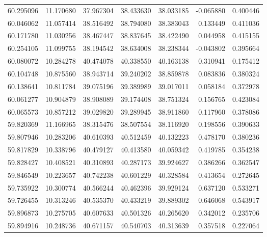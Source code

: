 \begin{tabular}{rrrrrrr}
 60.295096 &  11.170680 &         37.967304 &         38.433630 &         38.033185 & -0.065880 &  0.400446 \\
 60.046062 &  11.057414 &         38.516492 &         38.794080 &         38.383043 &  0.133449 &  0.411036 \\
 60.171780 &  11.030256 &         38.467447 &         38.837645 &         38.422490 &  0.044958 &  0.415155 \\
 60.254105 &  11.099755 &         38.194542 &         38.634008 &         38.238344 & -0.043802 &  0.395664 \\
 60.080072 &  10.284278 &         40.474078 &         40.338550 &         40.163138 &  0.310941 &  0.175412 \\
 60.104748 &  10.875560 &         38.943714 &         39.240202 &         38.859878 &  0.083836 &  0.380324 \\
 60.138641 &  10.811784 &         39.075196 &         39.389989 &         39.017011 &  0.058184 &  0.372978 \\
 60.061277 &  10.904879 &         38.908089 &         39.174408 &         38.751324 &  0.156765 &  0.423084 \\
 60.065573 &  10.857212 &         39.029820 &         39.289945 &         38.911860 &  0.117960 &  0.378086 \\
 59.820369 &  11.166965 &         38.315476 &         38.507554 &         38.116920 &  0.198556 &  0.390633 \\
 59.807946 &  10.283206 &         40.610393 &         40.512459 &         40.132223 &  0.478170 &  0.380236 \\
 59.817829 &  10.338796 &         40.479127 &         40.413580 &         40.059342 &  0.419785 &  0.354238 \\
 59.828427 &  10.408521 &         40.310893 &         40.287173 &         39.924627 &  0.386266 &  0.362547 \\
 59.846549 &  10.223657 &         40.742238 &         40.601229 &         40.328584 &  0.413654 &  0.272645 \\
 59.735922 &  10.300774 &         40.566244 &         40.462396 &         39.929124 &  0.637120 &  0.533271 \\
 59.726455 &  10.313246 &         40.535370 &         40.433219 &         39.889302 &  0.646068 &  0.543917 \\
 59.896873 &  10.275705 &         40.607633 &         40.501326 &         40.265620 &  0.342012 &  0.235706 \\
 59.894916 &  10.248736 &         40.671157 &         40.540703 &         40.313639 &  0.357518 &  0.227064 \\

\end{tabular}
